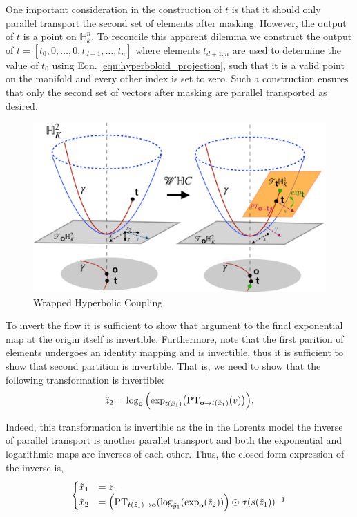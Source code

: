 One important consideration in the construction of $t$ is that it should only parallel transport the second set of elements after masking. However, the output of $t$ is a point on $\mathbb{H}^n_k$. To reconcile this apparent dilemma we construct the output of $t = [t_0, 0, \dots , 0, t_{d+1}, \dots , t_{n}]$ where elements $t_{d+1:n}$ are used to determine the value of $t_0$ using Eqn. \ref{eqn:hyperboloid_projection}, such that it is a valid point on the manifold and every other index is set to zero. Such a construction ensures that only the second set of vectors after masking are parallel transported as desired. 
\begin{figure}
    \centering
    \includegraphics[width=\linewidth]{hyperbolic_flows_arch.pdf}
    \vspace{-5mm}
    \caption{Wrapped Hyperbolic Coupling}
    \vspace{-10pt}
    \label{fig:whc_architecture_diagram}
\end{figure}
To invert the flow it is sufficient to show that argument to the final exponential map at the origin itself is invertible. Furthermore, note that the first parition of elements undergoes an identity mapping and is invertible, thus it is sufficient to show that second partition is invertible. That is, we need to show that the following transformation is invertible:
\begin{equation}
     \tilde{z}_{2} = \log_{\textbf{o}}\Big( \textnormal{exp}_{t(\tilde{x}_{1})}\big(\textnormal{PT}_{\textbf{o}\to t(\tilde{x}_{1}) }(v)\big)\Big),
\end{equation}

Indeed, this transformation is invertible as the in the Lorentz model the inverse of parallel transport is another parallel transport and both the exponential and logarithmic maps are inverses of each other. Thus, the closed form expression of the inverse is,
\begin{align}
     \begin{cases}
     \tilde{x}_{1} &= z_{1} \\
     \tilde{x}_{2} &= \Big( \textnormal{PT}_{t(\tilde{z}_{1}) \to \textbf{o} }(\log_{\tilde{y}_{1}}( \textnormal{exp}_{\textbf{o}}(\tilde{z}_{2}))\Big) \odot \sigma(s(\tilde{z}_{1}))^{-1} \\
    \end{cases}
\end{align}

